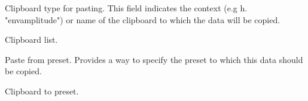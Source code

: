    \setcounter{ItemCounter}{0}      %

   Clipboard type for pasting.  
   This field indicates the context (e.g h. "envamplitude") or name of the
   clipboard to which the data will be copied.

   Clipboard list.

   Paste from preset.
   Provides a way to specify the preset to which this data should be
   copied.

   Clipboard to preset.

